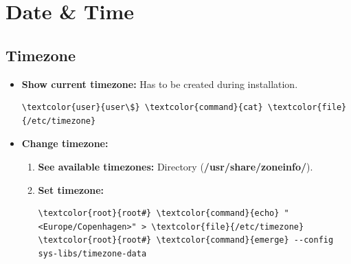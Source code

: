\documentclass[10pt, a4paper, onecolumn, oneside, titlepage, openany]{book}
\begin{document}
\section{Date \& Time}
\subsection{Timezone}
\begin{itemize}
    \item \textbf{Show current timezone:}
\newline Has to be created during installation.
\begin{Verbatim}[commandchars=\\\{\}]
\textcolor{user}{user\$} \textcolor{command}{cat} \textcolor{file}{/etc/timezone}
\end{Verbatim}
    \item \textbf{Change timezone:}
    \begin{enumerate}
        \item \textbf{See available timezones:}
\newline Directory (\textbf{\textcolor{dir}{/usr/share/zoneinfo/}}).
        \item \textbf{Set timezone:}
\begin{Verbatim}[commandchars=\\\{\}]
\textcolor{root}{root#} \textcolor{command}{echo} "<Europe/Copenhagen>" > \textcolor{file}{/etc/timezone}
\textcolor{root}{root#} \textcolor{command}{emerge} --config sys-libs/timezone-data
\end{Verbatim}
    \end{enumerate}
\end{itemize}
\end{document}
